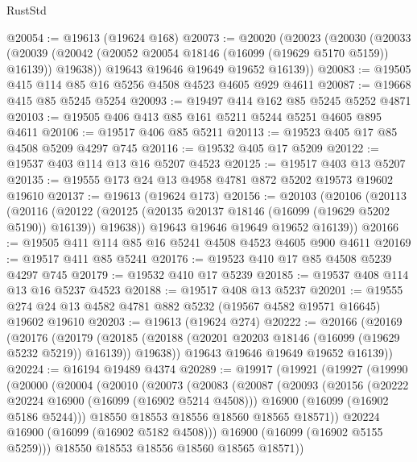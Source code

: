 \begin{lexlean}{RustStd}
\begin{coremodule}
@20054 := @19613 (@19624 @168)
@20073 := @20020
    (@20023
      (@20030
        (@20033
          (@20039 (@20042 (@20052 @20054 @18146 (@16099 (@19629 @5170 @5159)) @16139)) @19638))
        @19643
        @19646
        @19649
        @19652
        @16139))
@20083 := @19505 @415 @114 @85 @16 @5256 @4508 @4523 @4605 @929 @4611
@20087 := @19668 @415 @85 @5245 @5254
@20093 := @19497 @414 @162 @85 @5245 @5252 @4871
@20103 := @19505 @406 @413 @85 @161 @5211 @5244 @5251 @4605 @895 @4611
@20106 := @19517 @406 @85 @5211
@20113 := @19523 @405 @17 @85 @4508 @5209 @4297 @745
@20116 := @19532 @405 @17 @5209
@20122 := @19537 @403 @114 @13 @16 @5207 @4523
@20125 := @19517 @403 @13 @5207
@20135 := @19555 @173 @24 @13 @4958 @4781 @872 @5202 @19573 @19602 @19610
@20137 := @19613 (@19624 @173)
@20156 := @20103
    (@20106
      (@20113
        (@20116
          (@20122 (@20125 (@20135 @20137 @18146 (@16099 (@19629 @5202 @5190)) @16139)) @19638))
        @19643
        @19646
        @19649
        @19652
        @16139))
@20166 := @19505 @411 @114 @85 @16 @5241 @4508 @4523 @4605 @900 @4611
@20169 := @19517 @411 @85 @5241
@20176 := @19523 @410 @17 @85 @4508 @5239 @4297 @745
@20179 := @19532 @410 @17 @5239
@20185 := @19537 @408 @114 @13 @16 @5237 @4523
@20188 := @19517 @408 @13 @5237
@20201 := @19555 @274 @24 @13 @4582 @4781 @882 @5232 (@19567 @4582 @19571 @16645) @19602 @19610
@20203 := @19613 (@19624 @274)
@20222 := @20166
    (@20169
      (@20176
        (@20179
          (@20185 (@20188 (@20201 @20203 @18146 (@16099 (@19629 @5232 @5219)) @16139)) @19638))
        @19643
        @19646
        @19649
        @19652
        @16139))
@20224 := @16194 @19489 @4374
@20289 := @19917
    (@19921
      (@19927
        (@19990
          (@20000
            (@20004
              (@20010
                (@20073
                  (@20083
                    (@20087
                      (@20093
                        (@20156
                          (@20222 @20224 @16900 (@16099 (@16902 @5214 @4508)))
                          @16900
                          (@16099 (@16902 @5186 @5244)))
                        @18550
                        @18553
                        @18556
                        @18560
                        @18565
                        @18571))
                    @20224
                    @16900
                    (@16099 (@16902 @5182 @4508)))
                  @16900
                  (@16099 (@16902 @5155 @5259)))
                @18550
                @18553
                @18556
                @18560
                @18565
                @18571))

\end{coremodule}
\end{lexlean}
